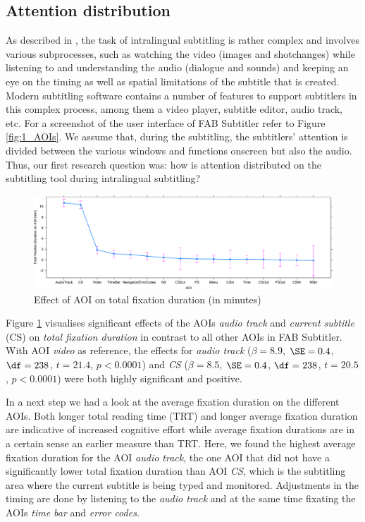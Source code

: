 \documentclass[output=paper]{langscibook}
\begin{document}
\subsection{Attention distribution}
As described in , the task of intralingual subtitling is rather complex and involves various subprocesses, such as watching the video (images and shot\linebreak changes) while listening to and understanding the audio (dialogue and sounds) and keeping an eye on the timing as well as spatial limitations of the subtitle that is created.
Modern subtitling software contains a number of features to support subtitlers in this complex process, among them a video player, subtitle editor, audio track, etc.
For a screenshot of the user interface of FAB Subtitler refer to Figure \ref{fig:1_AOIs}.
We assume that, during the subtitling, the subtitlers' attention is divided between the various windows and functions onscreen but also the audio.
Thus, our first research question was: how is attention distributed on the subtitling tool during intralingual subtitling?

\begin{figure}
\includegraphics[width=1\textwidth]{figures/LME1_TotalFixDur_AOI.pdf}
%
\caption{Effect of AOI on total fixation duration (in minutes)\label{fig:3_LME5}}
\end{figure}

Figure \ref{fig:3_LME5} visualises significant effects of the AOIs \textit{audio track} and \textit{current subtitle} (CS) on \textit{total fixation duration} in contrast to all other AOIs in FAB Subtitler.
With AOI \textit{video} as reference, the effects for \textit{audio track} ($\beta=8.9$, $\SE=0.4$, $\df=238$, $t=21.4$, $p<0.0001$) and \textit{CS} ($\beta=8.5$, $\SE=0.4$, $\df=238$, $t=20.5$, $p<0.0001$) were both highly significant and positive.

In a next step we had a look at the average fixation duration on the different AOIs.
Both longer total reading time (TRT) and longer average fixation duration are indicative of increased cognitive effort while average fixation durations are in a certain sense an earlier measure than TRT.
Here, we found the highest average fixation duration for the AOI \textit{audio track}, the one AOI that did not have a significantly lower total fixation duration than AOI \textit{CS}, which is the subtitling area where the current subtitle is being typed and monitored.
Adjustments in the timing are done by listening to the \textit{audio track} and at the same time fixating the AOIs \textit{time bar} and \textit{error codes}.
\end{document}
